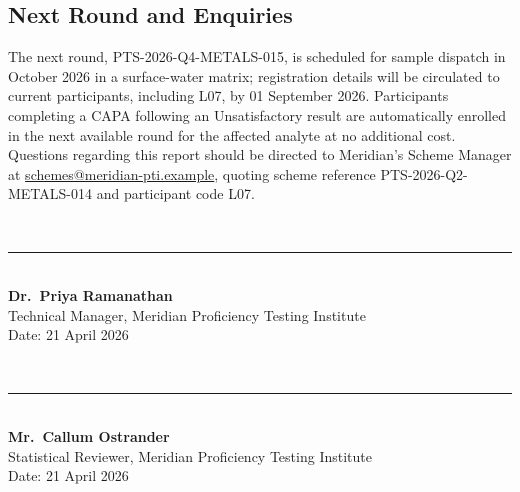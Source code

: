 \subsection{Next Round and Enquiries}
The next round, PTS-2026-Q4-METALS-015, is scheduled for sample dispatch in October 2026 in a
surface-water matrix; registration details will be circulated to current participants, including
L07, by 01 September 2026. Participants completing a CAPA following an Unsatisfactory result are
automatically enrolled in the next available round for the affected analyte at no additional
cost. Questions regarding this report should be directed to Meridian's Scheme Manager at
\href{mailto:schemes@meridian-pti.example}{schemes@meridian-pti.example}, quoting scheme
reference PTS-2026-Q2-METALS-014 and participant code L07.

\vspace{0.7em}
\noindent
\begin{minipage}{0.48\textwidth}
\faPen\ \rule{5.2cm}{0.4pt} \\[0.3em]
\textbf{Dr.\ Priya Ramanathan} \\
Technical Manager, Meridian Proficiency Testing Institute \\
Date: 21 April 2026
\end{minipage}\hfill
\begin{minipage}{0.48\textwidth}
\faPen\ \rule{5.2cm}{0.4pt} \\[0.3em]
\textbf{Mr.\ Callum Ostrander} \\
Statistical Reviewer, Meridian Proficiency Testing Institute \\
Date: 21 April 2026
\end{minipage}

\vspace{0.6em}
{\small


}
